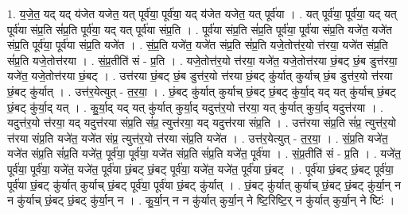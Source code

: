 \documentclass[17pt]{extarticle}
\begin{document}
1. य॒जे॒त॒ यद् यद् य॑जेत यजेत॒ यत् पूर्व॑या॒ पूर्व॑या॒ यद् य॑जेत यजेत॒ यत् पूर्व॑या । . यत् पूर्व॑या॒ पूर्व॑या॒ यद् यत् पूर्व॑या संप्र॒ति सं॑प्र॒ति पूर्व॑या॒ यद् यत् पूर्व॑या संप्र॒ति । . पूर्व॑या संप्र॒ति सं॑प्र॒ति पूर्व॑या॒ पूर्व॑या संप्र॒ति यजे॑त॒ यजे॑त संप्र॒ति पूर्व॑या॒ पूर्व॑या संप्र॒ति यजे॑त । . सं॒प्र॒ति यजे॑त॒ यजे॑त संप्र॒ति सं॑प्र॒ति यजे॒तोत्त॑र॒यो त्त॑रया॒ यजे॑त संप्र॒ति सं॑प्र॒ति यजे॒तोत्त॑रया । . सं॒प्र॒तीति॑ सं - प्र॒ति । . यजे॒तोत्त॑र॒यो त्त॑रया॒ यजे॑त॒ यजे॒तोत्त॑रया छं॒बट् छं॒ब डुत्त॑रया॒ यजे॑त॒ यजे॒तोत्त॑रया छं॒बट् । . उत्त॑रया छं॒बट् छं॒ब डुत्त॑र॒यो त्त॑रया छं॒बट् कु॑र्यात् कुर्याच् छं॒ब डुत्त॑र॒यो त्त॑रया छं॒बट् कु॑र्यात् । . उत्त॑र॒येत्युत् - त॒र॒या॒ । . छं॒बट् कु॑र्यात् कुर्याच् छं॒बट् छं॒बट् कु॑र्या॒द् यद् यत् कु॑र्याच् छं॒बट् छं॒बट् कु॑र्या॒द् यत् । . कु॒र्या॒द् यद् यत् कु॑र्यात् कुर्या॒द् यदुत्त॑र॒यो त्त॑रया॒ यत् कु॑र्यात् कुर्या॒द् यदुत्त॑रया । . यदुत्त॑र॒यो त्त॑रया॒ यद् यदुत्त॑रया संप्र॒ति सं॑प्र॒ त्युत्त॑रया॒ यद् यदुत्त॑रया संप्र॒ति । . उत्त॑रया संप्र॒ति सं॑प्र॒ त्युत्त॑र॒यो त्त॑रया संप्र॒ति यजे॑त॒ यजे॑त संप्र॒ त्युत्त॑र॒यो त्त॑रया संप्र॒ति यजे॑त । . उत्त॑र॒येत्युत् - त॒र॒या॒ । . सं॒प्र॒ति यजे॑त॒ यजे॑त संप्र॒ति सं॑प्र॒ति यजे॑त॒ पूर्व॑या॒ पूर्व॑या॒ यजे॑त संप्र॒ति सं॑प्र॒ति यजे॑त॒ पूर्व॑या । . सं॒प्र॒तीति॑ सं - प्र॒ति । . यजे॑त॒ पूर्व॑या॒ पूर्व॑या॒ यजे॑त॒ यजे॑त॒ पूर्व॑या छं॒बट् छं॒बट् पूर्व॑या॒ यजे॑त॒ यजे॑त॒ पूर्व॑या छं॒बट् । . पूर्व॑या छं॒बट् छं॒बट् पूर्व॑या॒ पूर्व॑या छं॒बट् कु॑र्यात् कुर्याच् छं॒बट् पूर्व॑या॒ पूर्व॑या छं॒बट् कु॑र्यात् । . छं॒बट् कु॑र्यात् कुर्याच् छं॒बट् छं॒बट् कु॑र्या॒न् न न कु॑र्याच् छं॒बट् छं॒बट् कु॑र्या॒न् न । . कु॒र्या॒न् न न कु॑र्यात् कुर्या॒न् ने ष्टि॒रिष्टि॒र् न कु॑र्यात् कुर्या॒न् ने ष्टिः॑ । \newline
\end{document}
